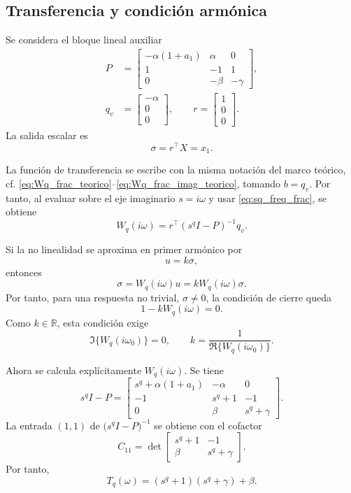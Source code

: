 \documentclass[journal]{IEEEtran}
\begin{document}
\subsection{Transferencia y condición armónica}

Se considera el bloque lineal auxiliar
\begin{equation}
\label{eq:P_qv_r_arctan}
\begin{aligned}
P&=
\begin{bmatrix}
-\alpha(1+a_1)&\alpha&0\\
1&-1&1\\
0&-\beta&-\gamma
\end{bmatrix},\\
q_v&=
\begin{bmatrix}
-\alpha\\0\\0
\end{bmatrix},
\qquad
r=
\begin{bmatrix}
1\\0\\0
\end{bmatrix}.
\end{aligned}
\end{equation}
La salida escalar es
\[
\sigma=r^\top X=x_1.
\]

La función de transferencia se escribe con la misma notación del marco teórico,
cf. \eqref{eq:Wq_frac_teorico}--\eqref{eq:Wq_frac_imag_teorico}, tomando
\(b=q_v\). Por tanto, al evaluar sobre el eje imaginario
\(s=i\omega\) y usar \eqref{eq:sq_freq_frac}, se obtiene
\begin{equation}
\label{eq:Wmath_arctan}
W_q(i\omega)
=
r^\top\left(s^q I-P\right)^{-1}q_v.
\end{equation}

Si la no linealidad se aproxima en primer armónico por
\[
u=k\sigma,
\]
entonces
\[
\sigma=W_q(i\omega)u
=
kW_q(i\omega)\sigma.
\]
Por tanto, para una respuesta no trivial, \(\sigma\neq0\), la condición de cierre queda
\begin{equation}
\label{eq:condition_arctan}
1-kW_q(i\omega)=0.
\end{equation}
Como \(k\in\mathbb R\), esta condición exige
\begin{equation}
\label{eq:omega_k_correcto_arctan}
\Im\{W_q(i\omega_0)\}=0,
\qquad
k=\frac{1}{\Re\{W_q(i\omega_0)\}}.
\end{equation}

Ahora se calcula explícitamente \(W_q(i\omega)\). Se tiene
\[
s^q I-P
=
\begin{bmatrix}
s^q+\alpha(1+a_1)&-\alpha&0\\
-1&s^q+1&-1\\
0&\beta&s^q+\gamma
\end{bmatrix}.
\]
La entrada \((1,1)\) de \(\bigl(s^q I-P\bigr)^{-1}\) se obtiene con el cofactor
\[
C_{11}
=
\det
\begin{bmatrix}
s^q+1&-1\\
\beta&s^q+\gamma
\end{bmatrix}.
\]
Por tanto,
\begin{equation}
\label{eq:T_arctan}
T_q(\omega)
=
\left(s^q+1\right)
\left(s^q+\gamma\right)
+\beta.
\end{equation}
\end{document}
